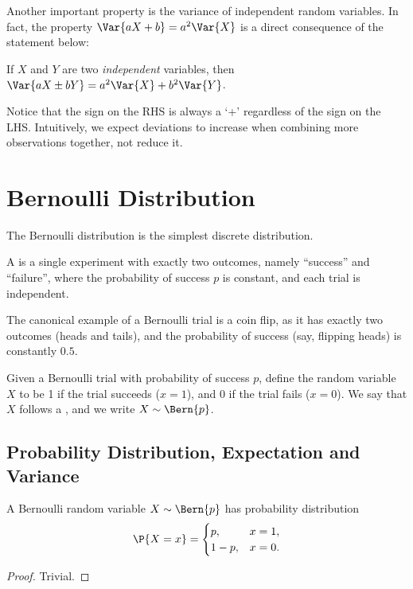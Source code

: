Another important property is the variance of independent random variables. In fact, the property $\Var{aX + b} = a^2 \Var{X}$ is a direct consequence of the statement below:

\begin{proposition}
    If $X$ and $Y$ are two \emph{independent} variables, then $\Var{aX \pm bY} = a^2 \Var{X} + b^2 \Var{Y}$.
\end{proposition}

Notice that the sign on the RHS is always a `+' regardless of the sign on the LHS. Intuitively, we expect deviations to increase when combining more observations together, not reduce it.

\section{Bernoulli Distribution}

The Bernoulli distribution is the simplest discrete distribution.

\begin{definition}
    A  is a single experiment with exactly two outcomes, namely ``success'' and ``failure'', where the probability of success $p$ is constant, and each trial is independent.
\end{definition}

The canonical example of a Bernoulli trial is a coin flip, as it has exactly two outcomes (heads and tails), and the probability of success (say, flipping heads) is constantly $0.5$.

\begin{definition}
    Given a Bernoulli trial with probability of success $p$, define the random variable $X$ to be 1 if the trial succeeds ($x = 1$), and 0 if the trial fails ($x = 0$). We say that $X$ follows a , and we write $X \sim \Bern{p}$.
\end{definition}

\subsection{Probability Distribution, Expectation and Variance}

\begin{proposition}
    A Bernoulli random variable $X \sim \Bern{p}$ has probability distribution \[\P{X = x} = 
    \begin{cases}
        p, & x = 1,\\
        1-p, & x = 0.
    \end{cases}\]
\end{proposition}
\begin{proof}
    Trivial.
\end{proof}

